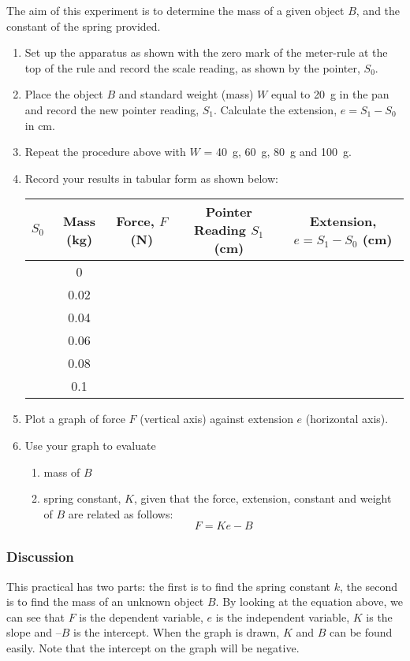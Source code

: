 The aim of this experiment is to determine the mass of a given object $B$, and the
constant of the spring provided.
\begin{enumerate}
\item{Set up the apparatus as shown with the zero mark of the meter-rule at the top
of the rule and record the scale reading, as shown by the pointer, $S_0$.}
\item{Place the object $B$ and standard weight (mass) $W$ equal to 20~g in the pan
and record the new pointer reading, $S_1$. Calculate the extension, $e = S_1 - S_0$ in
cm.}
\item{Repeat the procedure above with $W$ = 40~g, 60~g, 80~g and 100~g.}
\item{Record your results in tabular form as shown below:

\begin{center}
\begin{tabular}{ | c | c | c | c | c | }
\hline
$S_0$ & Mass (kg) & Force, $F$ (N) & Pointer Reading $S_1$ (cm) & Extension, $e = S_1 - S_0$ (cm) \\ \hline
& 0 & & & \\ \hline
& 0.02 & & & \\ \hline
& 0.04 & & & \\ \hline
& 0.06 & & & \\ \hline
& 0.08 & & & \\ \hline
& 0.1 & & & \\ \hline
\end{tabular}
\end{center}

}%
\item{Plot a graph of force $F$ (vertical axis) against extension $e$ (horizontal axis).}
\item{Use your graph to evaluate
\begin{enumerate}
\item{mass of $B$}
\item{spring constant, $K$, given that the force, extension, constant and
weight of $B$ are related as follows: $$F = Ke - B$$}
\end{enumerate}
}%
\end{enumerate}

\subsubsection{Discussion}

This practical has two parts: the first is to find the spring constant $k$, the second is
to find the mass of an unknown object $B$. By looking at the equation above, we
can see that $F$ is the dependent variable, $e$ is the independent variable, $K$ is the slope and
$–B$ is the intercept. When the graph is drawn, $K$ and $B$ can be found easily. Note that the
intercept on the graph will be negative.

